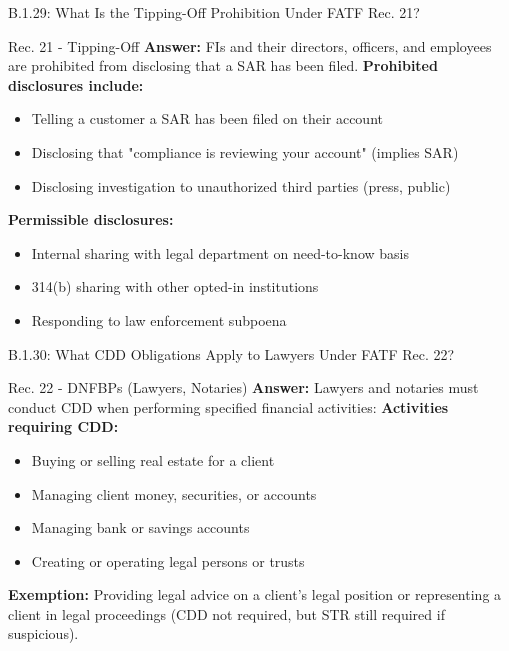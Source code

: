 \documentclass{beamer}
\begin{document}
	\begin{frame}{B.1.29: What Is the Tipping-Off Prohibition Under FATF Rec. 21?}
		\begin{block}{Rec. 21 - Tipping-Off}
			\textbf{Answer:} FIs and their directors, officers, and employees are prohibited from disclosing that a SAR has been filed.
			\vspace{0.2cm}
			\textbf{Prohibited disclosures include:}
			\begin{itemize}
				\item Telling a customer a SAR has been filed on their account
				\item Disclosing that "compliance is reviewing your account" (implies SAR)
				\item Disclosing investigation to unauthorized third parties (press, public)
			\end{itemize}
			\textbf{Permissible disclosures:}
			\begin{itemize}
				\item Internal sharing with legal department on need-to-know basis
				\item 314(b) sharing with other opted-in institutions
				\item Responding to law enforcement subpoena
			\end{itemize}
		\end{block}
	\end{frame}
	
	\begin{frame}{B.1.30: What CDD Obligations Apply to Lawyers Under FATF Rec. 22?}
		\begin{block}{Rec. 22 - DNFBPs (Lawyers, Notaries)}
			\textbf{Answer:} Lawyers and notaries must conduct CDD when performing specified financial activities:
			\vspace{0.2cm}
			\textbf{Activities requiring CDD:}
			\begin{itemize}
				\item Buying or selling real estate for a client
				\item Managing client money, securities, or accounts
				\item Managing bank or savings accounts
				\item Creating or operating legal persons or trusts
			\end{itemize}
			\textbf{Exemption:} Providing legal advice on a client's legal position or representing a client in legal proceedings (CDD not required, but STR still required if suspicious).
		\end{block}
	\end{frame}
	
\end{document}

